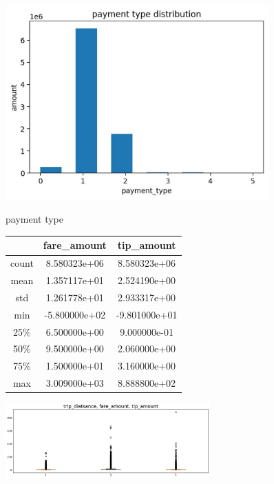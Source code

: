\documentclass[11pt]{article}
\begin{document}
\begin{figure}[H]
  \begin{minipage}[b]{0.5\textwidth} 
    \centering 
    \includegraphics[width=0.9\textwidth]{plots/payment type distribution.jpg} 
    \caption{payment type}
    \label{fig:by:table} 
  \end{minipage}%
  \begin{minipage}[b]{0.5\textwidth} 
    \centering
    \begin{tabular}{|c|c|c|} \hline 
      & fare\_amount & tip\_amount \\ \hline\hline 
      count & 8.580323e+06 & 8.580323e+06 \\
      mean &	1.357117e+01 &	2.524190e+00 \\
      std &	1.261778e+01 &	2.933317e+00 \\
      min &	-5.800000e+02 &	-9.801000e+01 \\
      25\% &	6.500000e+00 &	9.000000e-01 \\
      50\% &	9.500000e+00 &	2.060000e+00 \\
      75\% &	1.500000e+01 &	3.160000e+00 \\
      max &	3.009000e+03 &	8.888800e+02 \\
      \hline 
    \end{tabular} 
    \caption{}
    \label{tab:my_label}
\end{minipage} 
\end{figure}
\begin{figure}[H]
    \centering
    \includegraphics[width=0.7\textwidth]{plots/trip_diatsance, fare_amount, tip_amount.jpg}
    \caption{}
    \label{fig:my_label}
\end{figure}
\end{document}
